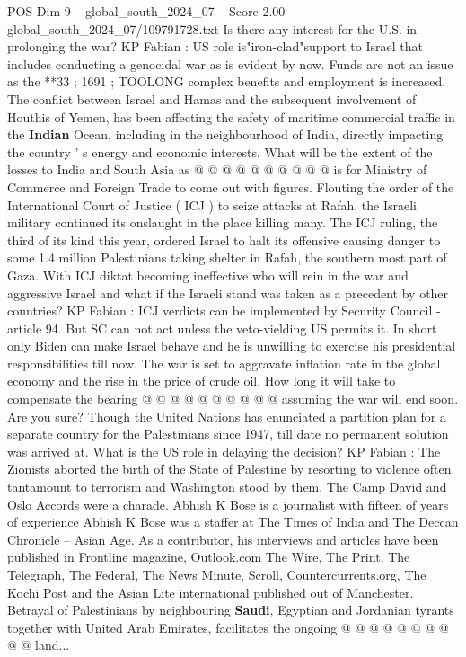 \begin{textsample}{POS Dim 9 – global\_south\_2024\_07 – Score 2.00 – global\_south\_2024\_07/109791728.txt}
Is there any interest for the U.S. in prolonging the war?
KP Fabian : US role is"iron-clad"support to Israel that includes conducting a genocidal war as is evident by now.
Funds are not an issue as the **33 ; 1691 ; TOOLONG complex benefits and employment is increased.
The conflict between Israel and Hamas and the subsequent involvement of Houthis of Yemen, has been affecting the safety of maritime commercial traffic in the \textbf{Indian} Ocean, including in the neighbourhood of India, directly impacting the country ' s energy and economic interests.
What will be the extent of the losses to India and South Asia as @ @ @ @ @ @ @ @ @ @ is for Ministry of Commerce and Foreign Trade to come out with figures.
Flouting the order of the International Court of Justice ( ICJ ) to seize attacks at Rafah, the Israeli military continued its onslaught in the place killing many.
The ICJ ruling, the third of its kind this year, ordered Israel to halt its offensive causing danger to some 1.4 million Palestinians taking shelter in Rafah, the southern most part of Gaza.
With ICJ diktat becoming ineffective who will rein in the war and aggressive Israel and what if the Israeli stand was taken as a precedent by other countries?
KP Fabian : ICJ verdicts can be implemented by Security Council -article 94.
But SC can not act unless the veto-vielding US permits it.
In short only Biden can make Israel behave and he is unwilling to exercise his presidential responsibilities till now.
The war is set to aggravate inflation rate in the global economy and the rise in the price of crude oil.
How long it will take to compensate the bearing @ @ @ @ @ @ @ @ @ @ assuming the war will end soon.
Are you sure?
Though the United Nations has enunciated a partition plan for a separate country for the Palestinians since 1947, till date no permanent solution was arrived at.
What is the US role in delaying the decision?
KP Fabian : The Zionists aborted the birth of the State of Palestine by resorting to violence often tantamount to terrorism and Washington stood by them.
The Camp David and Oslo Accords were a charade.
Abhish K Bose is a journalist with fifteen of years of experience Abhish K Bose was a staffer at The Times of India and The Deccan Chronicle -- Asian Age.
As a contributor, his interviews and articles have been published in Frontline magazine, Outlook.com The Wire, The Print, The Telegraph, The Federal, The News Minute, Scroll, Countercurrents.org, The Kochi Post and the Asian Lite international published out of Manchester.
Betrayal of Palestinians by neighbouring \textbf{Saudi}, Egyptian and Jordanian tyrants together with United Arab Emirates, facilitates the ongoing @ @ @ @ @ @ @ @ @ @ land...

\end{textsample}
